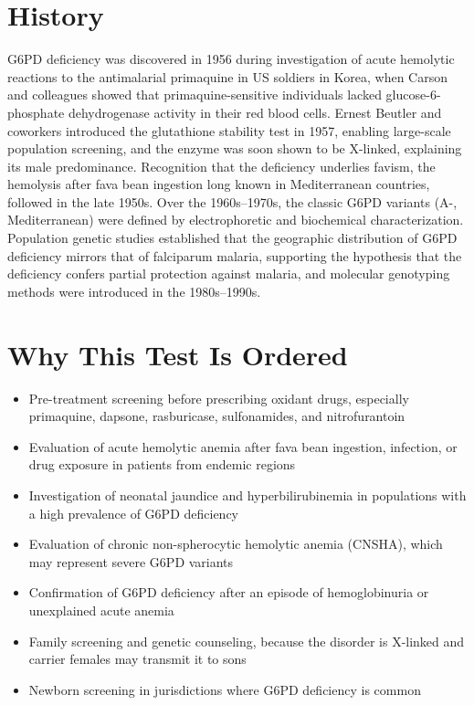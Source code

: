 \section*{History}
G6PD deficiency was discovered in 1956 during investigation of acute hemolytic reactions to the antimalarial primaquine in US soldiers in Korea, when Carson and colleagues showed that primaquine-sensitive individuals lacked glucose-6-phosphate dehydrogenase activity in their red blood cells. Ernest Beutler and coworkers introduced the glutathione stability test in 1957, enabling large-scale population screening, and the enzyme was soon shown to be X-linked, explaining its male predominance. Recognition that the deficiency underlies favism, the hemolysis after fava bean ingestion long known in Mediterranean countries, followed in the late 1950s. Over the 1960s--1970s, the classic G6PD variants (A-, Mediterranean) were defined by electrophoretic and biochemical characterization. Population genetic studies established that the geographic distribution of G6PD deficiency mirrors that of falciparum malaria, supporting the hypothesis that the deficiency confers partial protection against malaria, and molecular genotyping methods were introduced in the 1980s--1990s.
\section*{Why This Test Is Ordered}
\begin{itemize}
  \item Pre-treatment screening before prescribing oxidant drugs, especially primaquine, dapsone, rasburicase, sulfonamides, and nitrofurantoin
  \item Evaluation of acute hemolytic anemia after fava bean ingestion, infection, or drug exposure in patients from endemic regions
  \item Investigation of neonatal jaundice and hyperbilirubinemia in populations with a high prevalence of G6PD deficiency
  \item Evaluation of chronic non-spherocytic hemolytic anemia (CNSHA), which may represent severe G6PD variants
  \item Confirmation of G6PD deficiency after an episode of hemoglobinuria or unexplained acute anemia
  \item Family screening and genetic counseling, because the disorder is X-linked and carrier females may transmit it to sons
  \item Newborn screening in jurisdictions where G6PD deficiency is common
\end{itemize}
